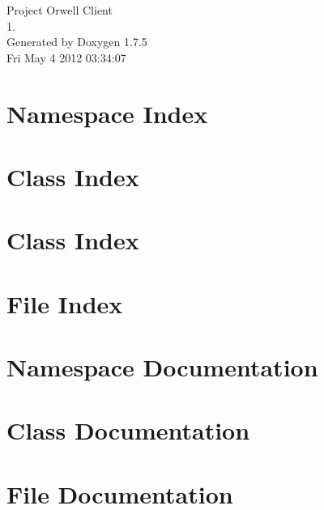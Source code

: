 \documentclass[a4paper]{book}
\begin{document}
\hypersetup{pageanchor=false,citecolor=blue}
\begin{titlepage}
\vspace*{7cm}
\begin{center}
{\Large \-Project \-Orwell \-Client \\[1ex]\large 1. }\\
\vspace*{1cm}
{\large \-Generated by Doxygen 1.7.5}\\
\vspace*{0.5cm}
{\small Fri May 4 2012 03:34:07}\\
\end{center}
\end{titlepage}
\clearemptydoublepage
{}
\tableofcontents
\clearemptydoublepage
{}
\hypersetup{pageanchor=true,citecolor=blue}
\chapter{\-Namespace \-Index}

\chapter{\-Class \-Index}

\chapter{\-Class \-Index}

\chapter{\-File \-Index}

\chapter{\-Namespace \-Documentation}


\chapter{\-Class \-Documentation}









\chapter{\-File \-Documentation}








\printindex
\end{document}
